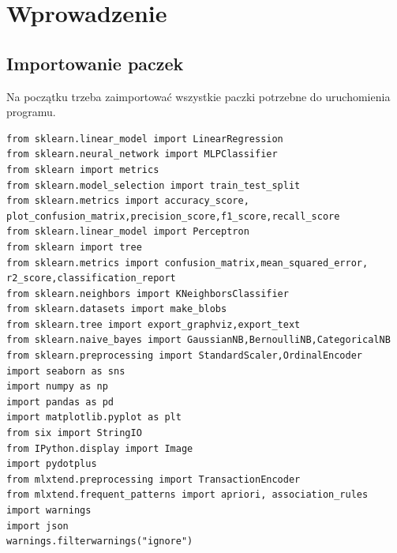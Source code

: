 \documentclass{article}
\begin{document}
\section{\LARGE{Wprowadzenie}}
\subsection{Importowanie paczek}
\newline\newline
\indent \large{Na początku trzeba zaimportować wszystkie paczki potrzebne do uruchomienia programu. }
\newline\newline
\begin{lstlisting}
from sklearn.linear_model import LinearRegression
from sklearn.neural_network import MLPClassifier
from sklearn import metrics
from sklearn.model_selection import train_test_split
from sklearn.metrics import accuracy_score, plot_confusion_matrix,precision_score,f1_score,recall_score
from sklearn.linear_model import Perceptron
from sklearn import tree
from sklearn.metrics import confusion_matrix,mean_squared_error, r2_score,classification_report
from sklearn.neighbors import KNeighborsClassifier
from sklearn.datasets import make_blobs
from sklearn.tree import export_graphviz,export_text
from sklearn.naive_bayes import GaussianNB,BernoulliNB,CategoricalNB
from sklearn.preprocessing import StandardScaler,OrdinalEncoder
import seaborn as sns
import numpy as np
import pandas as pd
import matplotlib.pyplot as plt
from six import StringIO
from IPython.display import Image  
import pydotplus
from mlxtend.preprocessing import TransactionEncoder
from mlxtend.frequent_patterns import apriori, association_rules
import warnings
import json
warnings.filterwarnings("ignore")
\end{lstlisting}
\newpage
\end{document}
